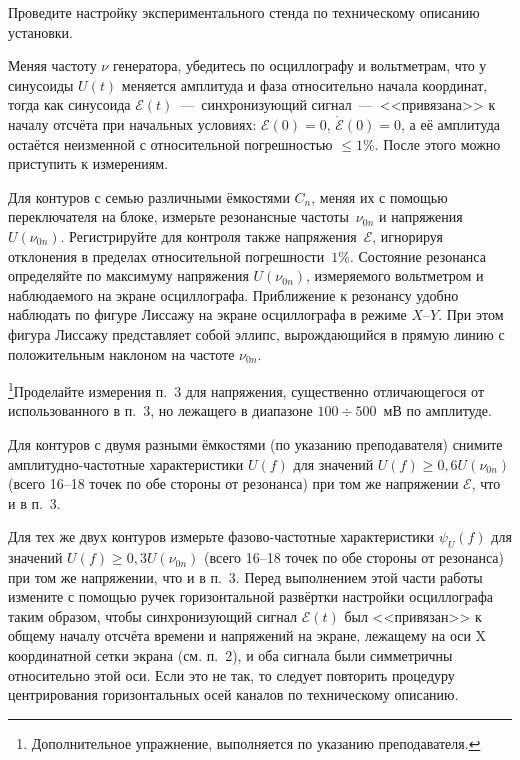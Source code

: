 \begin{lab:task}
    \item Проведите настройку экспериментального стенда по техническому описанию
установки.

    \item Меняя частоту $\nu$ генератора, убедитесь по осциллографу и вольтметрам,
что у синусоиды $U(t)$ меняется амплитуда и фаза относительно начала координат,
тогда как синусоида $\mathcal{E}(t)$~---~синхронизующий сигнал~---~<<привязана>>
к началу отсчёта при начальных условиях: $\mathcal{E}(0)=0$,
$\dot{\mathcal{E}}(0)=0$, а её амплитуда остаётся неизменной с относительной
погрешностью  $\le1\%$. После этого можно приступить к измерениям.

    \item Для контуров с семью различными ёмкостями $C_n$, меняя их с помощью
переключателя на блоке, измерьте резонансные частоты~$\nu_{0n}$ и напряжения
$U(\nu_{0n})$. Регистрируйте для контроля также напряжения~$\mathcal{E}$,
игнорируя отклонения в пределах относительной погрешности~$1\%$. Состояние
резонанса определяйте по максимуму напряжения $U(\nu_{0n})$, измеряемого
вольтметром и наблюдаемого на экране осциллографа. Приближение к резонансу
удобно наблюдать по фигуре Лиссажу на экране осциллографа в режиме $X$--$Y$.
При этом фигура Лиссажу представляет собой эллипс, вырождающийся в прямую линию
с положительным наклоном  на частоте $\nu_{0n}$.

    \item \footnote{Дополнительное упражнение, выполняется по указанию
        преподавателя.}Проделайте измерения п.~3 для напряжения, существенно 
    отличающегося от использованного в п.~3, но лежащего в диапазоне $100\div500$~мВ 
    по амплитуде.

    \item Для контуров с двумя разными ёмкостями (по указанию преподавателя)
снимите амплитудно-частотные характеристики $U(f)$ для значений
$U(f)\ge0,6U(\nu_{0n})$ (всего 16--18 точек по обе стороны от резонанса) при
том же напряжении $\mathcal{E}$, что и в п.~3.

    \item Для тех же двух контуров измерьте фазово-частотные характеристики
$\psi_U(f)$ для значений $U(f)\ge0,3U(\nu_{0n})$ (всего 16--18 точек по обе
стороны от резонанса) при том же напряжении, что и в п.~3. Перед выполнением
этой части работы измените с помощью ручек горизонтальной развёртки настройки
осциллографа таким образом, чтобы синхронизующий сигнал $\mathcal{E}(t)$ был
<<привязан>> к общему началу отсчёта времени и напряжений на экране, лежащему на
оси X координатной сетки экрана (см. п.~2), и оба сигнала были симметричны
относительно этой оси. Если это не так, то следует повторить процедуру
центрирования горизонтальных осей каналов по техническому описанию.


\end{lab:task}
